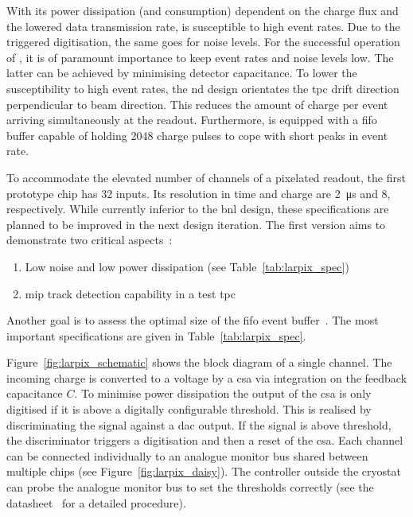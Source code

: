 With its power dissipation (and consumption) dependent on the charge flux and the lowered data transmission rate, \larpix{} is susceptible to high event rates.
Due to the triggered digitisation, the same goes for noise levels.
For the successful operation of \larpix{}, it is of paramount importance to keep event rates and noise levels low.
The latter can be achieved by minimising detector capacitance.
To lower the susceptibility to high event rates, the \dune{} \gls{nd} design orientates the \gls{tpc} drift direction perpendicular to beam direction.
This reduces the amount of charge per event arriving simultaneously at the readout.
Furthermore, \larpix{} is equipped with a \gls{fifo} buffer capable of holding \num{2048} charge pulses to cope with short peaks in event rate.

To accommodate the elevated number of channels of a pixelated readout, the first \larpix{} prototype chip has \num{32} inputs.
Its resolution in time and charge are \SI{2}{\micro\second} and \SI{8}{\bit}, respectively.
While currently inferior to the \gls{bnl} design, these specifications are planned to be improved in the next design iteration.
The first \larpix{} version aims to demonstrate two critical aspects~\cite{dan_larpix_arcCM}:
\begin{enumerate}
	\item Low noise and low power dissipation (see Table~\ref{tab:larpix_spec})
	\item \gls{mip} track detection capability in a test \gls{tpc}
\end{enumerate}
Another goal is to assess the optimal size of the \gls{fifo} event buffer~\cite{danLarpix}.
The most important \larpix{} specifications are given in Table~\ref{tab:larpix_spec}.

Figure~\ref{fig:larpix_schematic} shows the block diagram of a single \larpix{} channel.
The incoming charge is converted to a voltage by a \gls{csa} via integration on the feedback capacitance $C$.
To minimise power dissipation the output of the \gls{csa} is only digitised if it is above a digitally configurable threshold.
This is realised by discriminating the signal against a \gls{dac} output.
If the signal is above threshold, the discriminator triggers a digitisation and then a reset of the \gls{csa}.
Each channel can be connected individually to an analogue monitor bus shared between multiple \larpix{} chips (see Figure~\ref{fig:larpix_daisy}).
The \larpix{} controller outside the cryostat can probe the analogue monitor bus to set the thresholds correctly (see the datasheet~\cite{larpix_spec} for a detailed procedure).

